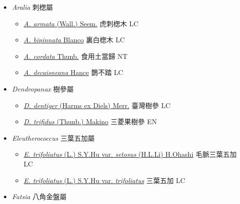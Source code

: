 
  \begin{itemize}
 \item[] \textit{Aralia} 刺楤屬
                    
  \begin{itemize}
        \item[] \href{http://www.theplantlist.org/tpl1.1/search?q=Aralia+armata}{\textit{A. armata} (Wall.) Seem.}   虎刺楤木 LC
        \item[] \href{http://www.theplantlist.org/tpl1.1/search?q=Aralia+bipinnata}{\textit{A. bipinnata} Blanco}   裏白楤木 LC
        \item[] \href{http://www.theplantlist.org/tpl1.1/search?q=Aralia+cordata}{\textit{A. cordata} Thunb.}   食用土當歸 NT
        \item[] \href{http://www.theplantlist.org/tpl1.1/search?q=Aralia+decaisneana}{\textit{A. decaisneana} Hance}   鵲不踏 LC
  \end{itemize}
 \item[] \textit{Dendropanax} 樹參屬
                    
  \begin{itemize}
        \item[] \href{http://www.theplantlist.org/tpl1.1/search?q=Dendropanax+dentiger}{\textit{D. dentiger} (Harms ex Diels) Merr.}   臺灣樹參 LC
        \item[] \href{http://www.theplantlist.org/tpl1.1/search?q=Dendropanax+trifidus}{\textit{D. trifidus} (Thunb.) Makino}   三菱果樹參 EN
  \end{itemize}
 \item[] \textit{Eleutherococcus} 三葉五加屬
                    
  \begin{itemize}
        \item[] \href{http://www.theplantlist.org/tpl1.1/search?q=Eleutherococcus+trifoliatus+var.+setosus}{\textit{E. trifoliatus} (L.) S.Y.Hu var. \textit{setosus} (H.L.Li) H.Ohashi}   毛脈三葉五加 LC
        \item[] \href{http://www.theplantlist.org/tpl1.1/search?q=Eleutherococcus+trifoliatus+var.+trifoliatus}{\textit{E. trifoliatus} (L.) S.Y.Hu var. \textit{trifoliatus}}   三葉五加 LC
  \end{itemize}
 \item[] \textit{Fatsia} 八角金盤屬
                    

\end{itemize}
